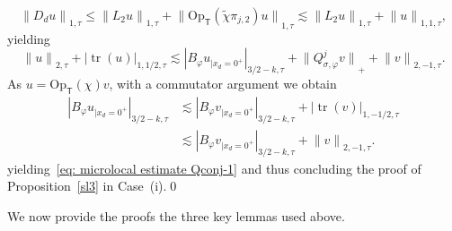 \documentclass[10pt]{amsart}
\theoremstyle{plain}
\theoremstyle{definition}
\newcommand{\tchi}{\tilde{\chi}}
\newcommand{\br}{\ensuremath{_{|x_d=0^+}}}
\newcommand{\Opt}{\ensuremath{\mathrm{Op}_{\scriptscriptstyle{\mathsf{T}}}}}
\newcommand{\Norm}[2]{{\| #1 \|}_{#2}}
\newcommand{\Normsc}[2]{{\| #1 \|}_{#2, \tau}}
\newcommand{\normsc}[2]{{| #1 |}_{#2, \tau}}
\newcommand{\bignormsc}[2]{{\big| #1 \big|}_{#2, \tau}}
\newcommand{\Qconj}{Q_{\sigma,\varphi}}
\DeclareMathOperator{\trace}{tr}
\begin{document}
\begin{equation*}
\Normsc{D_du}{1} \leq
\Normsc{L_2 u}{1} + \Normsc{\Opt(\tchi \pi_{j,2}) u}{1}
\lesssim
\Normsc{L_2 u}{1} + \Normsc{u}{1,1},
\end{equation*}
yielding
\begin{equation*}
\Normsc{u}{2} + \bignormsc{\trace (u)}{1,1/2}
\lesssim
\normsc{B_{\varphi}u\br}{3/2-k}
+ \Norm{\Qconj^jv}{+}
+\Normsc{v}{2,-1}.
\end{equation*}
As $u=\Opt(\chi)v$, with a commutator argument we obtain
\begin{align*}
\normsc{B_{\varphi}u\br}{3/2-k}
& \lesssim
\normsc{B_{\varphi}v\br}{3/2-k}
+ \normsc{\trace(v)}{1,-1/2}\\
& \lesssim
\normsc{B_{\varphi}v\br}{3/2-k}
+ \Normsc{v}{2,-1}.
\end{align*}
yielding~\eqref{eq: microlocal estimate Qconj-1} and
thus concluding the proof of
Proposition~\ref{sl3} in Case~(i).\qed

\medskip
We now provide the proofs the three key lemmas used above.
\end{document}
